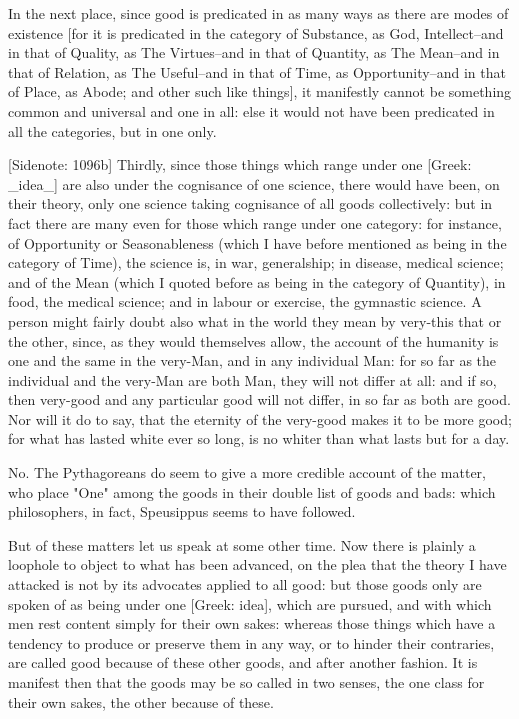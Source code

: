In the next place, since good is predicated in as many ways as there are
modes of existence [for it is predicated in the category of Substance,
as God, Intellect--and in that of Quality, as The Virtues--and in that
of Quantity, as The Mean--and in that of Relation, as The Useful--and in
that of Time, as Opportunity--and in that of Place, as Abode; and
other such like things], it manifestly cannot be something common and
universal and one in all: else it would not have been predicated in all
the categories, but in one only.

[Sidenote: 1096b] Thirdly, since those things which range under one
[Greek: _idea_] are also under the cognisance of one science, there
would have been, on their theory, only one science taking cognisance of
all goods collectively: but in fact there are many even for those which
range under one category: for instance, of Opportunity or Seasonableness
(which I have before mentioned as being in the category of Time), the
science is, in war, generalship; in disease, medical science; and of the
Mean (which I quoted before as being in the category of Quantity), in
food, the medical science; and in labour or exercise, the gymnastic
science. A person might fairly doubt also what in the world they mean by
very-this that or the other, since, as they would themselves allow, the
account of the humanity is one and the same in the very-Man, and in any
individual Man: for so far as the individual and the very-Man are both
Man, they will not differ at all: and if so, then very-good and any
particular good will not differ, in so far as both are good. Nor will it
do to say, that the eternity of the very-good makes it to be more good;
for what has lasted white ever so long, is no whiter than what lasts but
for a day.

No. The Pythagoreans do seem to give a more credible account of the
matter, who place "One" among the goods in their double list of goods
and bads: which philosophers, in fact, Speusippus seems to have
followed.

But of these matters let us speak at some other time. Now there is
plainly a loophole to object to what has been advanced, on the plea that
the theory I have attacked is not by its advocates applied to all good:
but those goods only are spoken of as being under one [Greek: idea],
which are pursued, and with which men rest content simply for their own
sakes: whereas those things which have a tendency to produce or preserve
them in any way, or to hinder their contraries, are called good because
of these other goods, and after another fashion. It is manifest then
that the goods may be so called in two senses, the one class for their
own sakes, the other because of these.

